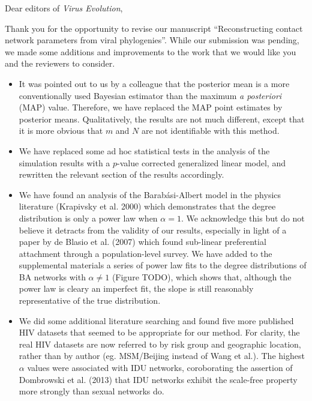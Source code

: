 \documentclass[12pt]{letter}
\begin{document}
\begin{letter}{ }

\opening{Dear editors of \textit{Virus Evolution},}

Thank you for the opportunity to revise our manuscript ``Reconstructing contact
network parameters from viral phylogenies''. While our submission was pending,
we made some additions and improvements to the work that we would like you and
the reviewers to consider. 

\begin{itemize}

  \item It was pointed out to us by a colleague that the posterior mean is a
    more conventionally used Bayesian estimator than the maximum \textit{a
    posteriori} (MAP) value. Therefore, we have replaced the MAP point
    estimates by posterior means. Qualitatively, the results are not much
    different, except that it is more obvious that $m$ and $N$ are not
    identifiable with this method. 
  \item We have replaced some ad hoc statistical tests in the analysis of the
    simulation results with a $p$-value corrected generalized linear model, and
    rewritten the relevant section of the results accordingly.
  \item We have found an analysis of the Barab\'asi-Albert model in the physics
    literature (Krapivsky et al. 2000) which demonstrates that the degree
    distribution is only a power law when $\alpha = 1$. We acknowledge this but
    do not believe it detracts from the validity of our results, especially in
    light of a paper by de Blasio et al. (2007) which found sub-linear
    preferential attachment through a population-level survey. We have added to
    the supplemental materials a series of power law fits to the degree
    distributions of BA networks with $\alpha \neq 1$ (Figure TODO), which
    shows that, although the power law is cleary an imperfect fit, the slope
    is still reasonably representative of the true distribution.
  \item We did some additional literature searching and found five more
    published HIV datasets that seemed to be appropriate for our method. For
    clarity, the real HIV datasets are now referred to by risk group and
    geographic location, rather than by author (eg. MSM/Beijing instead of Wang
    et al.). The highest $\alpha$ values were associated with IDU networks,
    coroborating the assertion of Dombrowski et al. (2013) that IDU networks
    exhibit the scale-free property more strongly than sexual networks do. 

\end{itemize}
\end{letter}
\end{document}
